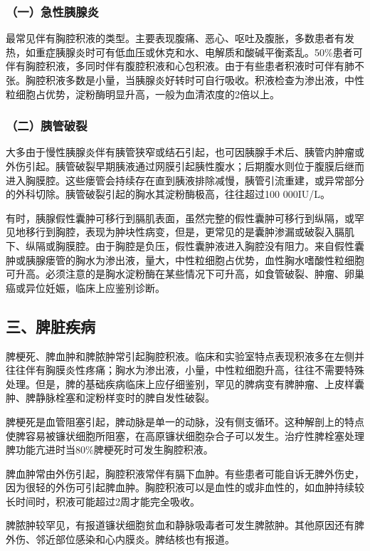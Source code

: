 \subsubsection{（一）急性胰腺炎}

最常见伴有胸腔积液的类型。主要表现腹痛、恶心、呕吐及腹胀，多数患者有发热，如重症胰腺炎时可有低血压或休克和水、电解质和酸碱平衡紊乱。50\%患者可伴有胸腔积液，多同时伴有腹腔积液和心包积液。由于有些患者积液时可伴有肺不张。胸腔积液多数是小量，当胰腺炎好转时可自行吸收。积液检查为渗出液，中性粒细胞占优势，淀粉酶明显升高，一般为血清浓度的2倍以上。

\subsubsection{（二）胰管破裂}

大多由于慢性胰腺炎伴有胰管狭窄或结石引起，也可因胰腺手术后、胰管内肿瘤或外伤引起。胰管破裂早期胰液通过网膜引起胰性腹水；后期腹水则位于腹膜后继而进入胸膜腔。这些瘘管会持续存在直到胰液排除减慢，胰管引流重建，或异常部分的外科切除。胰管破裂引起的胸水其淀粉酶极高，往往超过100
000IU/L。

有时，胰腺假性囊肿可移行到膈肌表面，虽然完整的假性囊肿可移行到纵隔，或罕见地移行到胸腔，表现为肿块性病变，但是，更常见的是囊肿渗漏或破裂入膈肌下、纵隔或胸膜腔。由于胸腔是负压，假性囊肿液进入胸腔没有阻力。来自假性囊肿或胰腺瘘管的胸水为渗出液，量大，中性粒细胞占优势，血性胸水嗜酸性粒细胞可升高。必须注意的是胸水淀粉酶在某些情况下可升高，如食管破裂、肿瘤、卵巢癌或异位妊娠，临床上应鉴别诊断。

\subsection{三、脾脏疾病}

脾梗死、脾血肿和脾脓肿常引起胸腔积液。临床和实验室特点表现积液多在左侧并往往伴有胸膜炎性疼痛；胸水为渗出液，小量，中性粒细胞升高，往往不需要特殊处理。但是，脾的基础疾病临床上应仔细鉴别，罕见的脾病变有脾肿瘤、上皮样囊肿、脾静脉栓塞和淀粉样变时的脾自发性破裂。

脾梗死是血管阻塞引起，脾动脉是单一的动脉，没有侧支循环。这种解剖上的特点使脾容易被镰状细胞所阻塞，在高原镰状细胞杂合子可以发生。治疗性脾栓塞处理脾功能亢进时当80\%脾梗死时可发生胸腔积液。

脾血肿常由外伤引起，胸腔积液常伴有膈下血肿。有些患者可能自诉无脾外伤史，因为很轻的外伤可引起脾血肿。胸腔积液可以是血性的或非血性的，如血肿持续较长时间时，积液可能超过2周才能完全吸收。

脾脓肿较罕见，有报道镰状细胞贫血和静脉吸毒者可发生脾脓肿。其他原因还有脾外伤、邻近部位感染和心内膜炎。脾结核也有报道。


